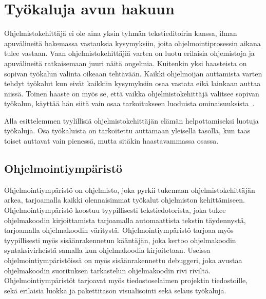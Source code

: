 \documentclass[finnish]{../tktltiki2}
\theoremstyle{definition}
\theoremstyle{remark}
\begin{document}
\section{Työkaluja avun hakuun}
Ohjelmistokehittäjä ei ole aina yksin tyhmän tekstieditoirin kanssa, ilman apuvälineitä hakemassa vastauksia kysymyksiin, joita ohjelmointiprosessin aikana tulee vastaan. Vaan ohjelmistokehittäjiä varten on luotu erilaisia ohjemistoja ja apuvälineitä ratkaisemaan juuri näitä ongelmia.
Kuitenkin yksi haasteista on sopivan työkalun valinta oikeaan tehtävään. Kaikki ohjelmoijan auttamista varten tehdyt työkalut kun eivät kaikkiin kysymyksiin osaa vastata eikä lainkaan auttaa niissä. Toinen haaste on myös se, että vaikka ohjelmistokehittäjä valitsee sopivan työkalun, käyttää hän siitä vain osaa tarkoitukseen luoduista ominaisuuksista~\cite{whyline}.

Alla esittelemmen tyylillisiä ohjelmistokehittäjän elämän helpottamiseksi luotuja työkaluja. Osa työkaluista on tarkoitettu auttamaan yleisellä tasolla, kun taas toiset auttavat vain pienessä, mutta sitäkin haastavammassa osassa.

\subsection{Ohjelmointiympäristö}
Ohjelmointiympäristö on ohjelmisto, joka pyrkii tukemaan ohjelmistokehittäjän arkea, tarjoamalla kaikki olennaisimmat työkalut ohjelmiston kehittämiseen. Ohjelmointiympäristö koostuu tyypillisesti tekstiedotorista, joka tukee ohjelmakoodin kirjoittamista tarjoamalla automaattista tekstin täydennystä, tarjoamalla ohjelmakoodin väritystä. Ohjelmointiympäristö tarjoaa myös tyypillisesti myös sisäänrakennetun kääntäjän, joka kertoo ohjelmakoodin syntaksivirheistä samalla kun ohjelmakoodia kirjoitetaan. Useissa ohjelmointiympäristöissä on myös sisäänrakennettu debuggeri, joka avustaa ohjelmakoodin suorituksen tarkastelun ohjelmakoodin rivi riviltä. Ohjelmointiympäristöt tarjoavat myös tiedostoselaimen projektin tiedostoille, sekä erilaisia luokka ja pakettitason visualisointi sekä selaus työkaluja.
\end{document}
